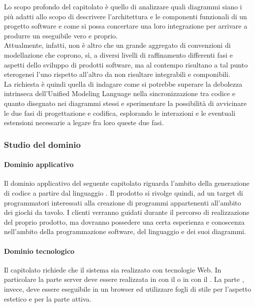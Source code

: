 		
		Lo scopo profondo del capitolato è quello di analizzare quali diagrammi  siano i più adatti allo scopo di descrivere l'architettura 
		e le componenti funzionali di un progetto software e come si possa concertare una loro integrazione per arrivare a produrre un eseguibile vero e proprio. 
		\\Attualmente, infatti,  non è altro che un grande aggregato di convenzioni di modellazione che coprono, sì, a diversi livelli di raffinamento differenti 
		fasi e aspetti dello sviluppo di prodotti software, ma al contempo risultano a tal punto eterogenei l'uno rispetto all'altro da non risultare integrabili e componibili. 
		\\La richiesta è quindi quella di indagare come si potrebbe superare la debolezza intrinseca dell'Unified Modeling Language nella sincronizzazione tra 
		codice e quanto disegnato nei diagrammi stessi e sperimentare la possibilità di avvicinare le due fasi di progettazione e codifica, esplorando le 
		interazioni e le eventuali estensioni necessarie a legare fra loro queste due fasi.
		\subsubsection{Studio del dominio}
			\paragraph{Dominio applicativo} Il dominio applicativo del seguente capitolato riguarda l'ambito della generazione di codice a partire dal linguaggio . Il prodotto si rivolge quindi, ad un target di programmatori interessati alla creazione di programmi appartenenti all'ambito dei giochi da tavolo. I clienti verranno guidati durante il percorso di realizzazione del proprio prodotto, ma dovranno possedere una certa esperienza e conoscenza nell'ambito della programmazione software, del linguaggio  e dei suoi diagrammi.
			
			\paragraph{Dominio tecnologico}
			Il capitolato richiede che il sistema sia realizzato con tecnologie Web. In particolare la parte server deve essere realizzata in  con il  
			 o in  con il  . La parte , invece, deve essere eseguibile in un browser  ed utilizzare fogli di stile  per 
			l'aspetto estetico e  per la parte attiva.
		
